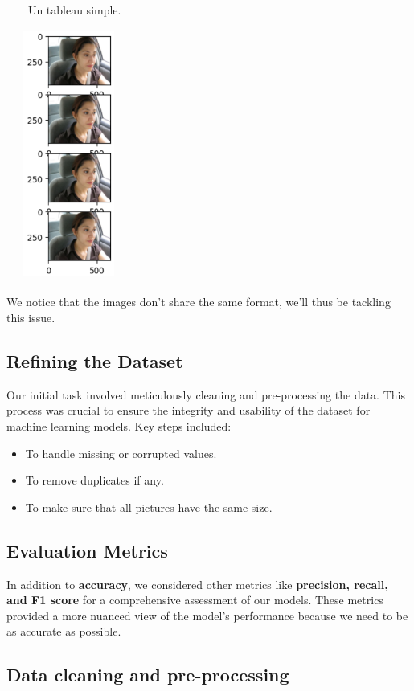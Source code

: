 \documentclass{modeleRapport}
\begin{document}
\begin{table}[H]
\begin{tabular}{|c|c|c|c|}
        &
        \includegraphics[width=3cm]{Images/noYawn.png}
        \\
        \hline
    \end{tabular}
    \caption{Un tableau simple.}
\end{table}

We notice that the images don't share the same format, we'll thus be tackling this issue.

\subsection{Refining the Dataset}
Our initial task involved meticulously cleaning and pre-processing the data. This process was crucial to ensure the integrity and usability of the dataset for machine learning models. Key steps included: 
\begin{itemize}
    \item To handle missing or corrupted values.
    \item To remove duplicates if any.
    \item To make sure that all pictures have the same size. 
\end{itemize}

\subsection{Evaluation Metrics}

In addition to \textbf{accuracy}, we considered other metrics like \textbf{precision, recall, and F1 score} for a comprehensive assessment of our models. These metrics provided a more nuanced view of the model's performance because we need to be as accurate as possible. 

\subsection{Data cleaning and pre-processing}
\end{document}
